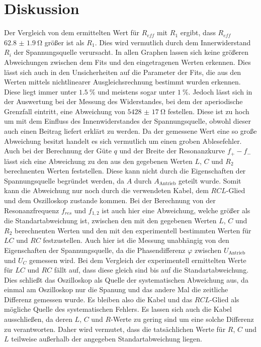 \section{Diskussion}
\label{sec:Diskussion}
Der Vergleich von dem ermittelten Wert für $R_{eff}$ mit $R_1$ ergibt, dass $R_{eff}$ $\SI{62.8(19)}{\ohm}$ größer ist als $R_1$. Dies wird vermutlich durch dem Innerwiderstand $R_i$ der Spannungsquelle verursacht.
In allen Graphen lassen sich keine größeren Abweichungen zwischen dem Fits und den eingetragenen Werten erkennen. Dies lässt sich auch in den Unsicherheiten auf die Parameter der Fits, die aus den Werten mittels nichtlinearer Ausgleichsrechnung bestimmt wurden erkennen. Diese liegt immer unter $\SI{1.5}{\percent}$ und meistens sogar unter $\SI{1}{\percent}$. Jedoch lässt sich in der Auswertung bei der Messung des Widerstandes, bei dem der aperiodische Grenzfall eintritt, eine Abweichung von $\SI{5428(17)}{\ohm}$ festellen. Diese ist zu hoch um mit dem Einfluss des Innenwiderstandes der Spannungsquelle, obwohl dieser auch einen Beitrag liefert erklärt zu werden. Da der gemessene Wert eine so große Abweichung besitzt handelt es sich vermutlich um einen groben Ablesefehler. Auch bei der Berechnung der Güte $q$ und der Breite der Resonanzkurve $f_+ - f_-$ lässt sich eine Abweichung zu den aus den gegebenen Werten $L$, $C$ und $R_2$ berechnenten Werten feststellen. Diese kann nicht durch die Eigenschaften der Spannungsquelle begründet werden, da $A$ durch $A_{\text{Antrieb}}$ geteilt wurde. Somit kann die Abweichung nur noch durch die verwendeten Kabel, dem $RCL$-Glied und dem Oszilloskop zustande kommen. Bei der Berechnung von der Resonanzfrequenz $f_{res}$ und $f_{1,2}$ ist auch hier eine Abweichung, welche größer als die Standartabweichung ist, zwischen den mit den gegebenen Werten $L$, $C$ und $R_2$ berechnenten Werten und den mit den experimentell bestimmten Werten für $LC$ und $RC$ festzustellen. Auch hier ist die Messung unabhängig von den Eigenschaften der Spannungsquelle, da die Phasendifferenz $\varphi$ zwischen $U_{\text{Antrieb}}$ und $U_C$ gemessen wird. Bei dem Vergleich der experimentell ermittelten Werte für $LC$ und $RC$ fällt auf, dass diese gleich sind bis auf die Standartabweichung. Dies schließt das Oszilloskop als Quelle der systematischen Abweichung aus, da einmal am Oszilloskop nur die Spanung und das andere Mal die zeitliche Differenz gemessen wurde. Es bleiben also die Kabel und das $RCL$-Glied als mögliche Quelle des systematischen Fehlers. Es lassen sich auch die Kabel ausschließen, da deren $L$, $C$ und $R$-Werte zu gering sind um eine solche Differenz zu verantworten. Daher wird vermutet, dass die tatsächlichen Werte für $R$, $C$ und $L$ teilweise außerhalb der angegeben Standartabweichung liegen.
